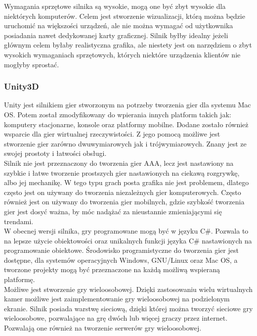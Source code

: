 \documentclass{article} %
\begin{document}
        Wymagania sprzętowe silnika są wysokie, mogą one być zbyt wysokie dla niektórych komputerów. Celem jest stworzenie wizualizacji, którą można będzie uruchomić na większości urządzeń, ale nie można wymagać od użytkownika posiadania nawet dedykowanej karty graficznej. Silnik byłby idealny jeżeli głównym celem byłaby realistyczna grafika, ale niestety jest on narzędziem o zbyt wysokich wymaganiach sprzętowych, których niektóre urządzenia klientów nie mogłyby sprostać.
        \\
        
        \subsubsection*{Unity3D}
        Unity jest silnikiem gier stworzonym na potrzeby tworzenia gier dla systemu Mac OS. Potem został zmodyfikowany do wpierania innych platform takich jak: komputery stacjonarne, konsole oraz platformy mobilne. Dodane zostało również wsparcie dla gier wirtualnej rzeczywistości. Z jego pomocą możliwe jest stworzenie gier zarówno dwuwymiarowych jak i trójwymiarowych. Znany jest ze swojej prostoty i łatwości obsługi.
        \\
        
        Silnik nie jest przeznaczony do tworzenia gier AAA, lecz jest nastawiony na szybkie i łatwe tworzenie prostszych gier nastawionych na ciekawą rozgrywkę, albo jej mechanikę. W tego typu grach posta grafika nie jest problemem, dlatego często jest on używany do tworzenia niezależnych gier komputerowych. Często również jest on używany do tworzenia gier mobilnych, gdzie szybkość tworzenia gier jest dosyć ważna, by móc nadążać za nieustannie zmieniającymi się trendami.
        \\
        
        W obecnej wersji silnika, gry programowane mogą być w języku C\#. Pozwala to na lepsze użycie obiektowości oraz unikalnych funkcji języka C\# nastawionych na programowanie obiektowe. Środowisko programistyczne do tworzenia gier jest dostępne, dla systemów operacyjnych Windows, GNU/Linux oraz Mac OS, a tworzone projekty mogą być przeznaczone na każdą możliwą wspieraną platformę.
        \\
        
        Możliwe jest stworzenie gry wieloosobowej. Dzięki zastosowaniu wielu wirtualnych kamer możliwe jest zaimplementowanie gry wieloosobowej na podzielonym ekranie. Silnik posiada warstwę sieciową, dzięki której można tworzyć sieciowe gry wieloosobowe, pozwalające na grę dwóch lub więcej graczy przez internet. Pozwalają one również na tworzenie serwerów gry wieloosobowej.
        \\
        
\end{document}
